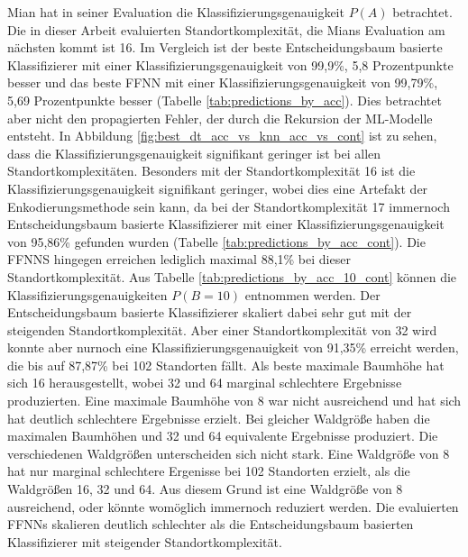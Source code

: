 \newline
\newline
Mian hat in seiner Evaluation die Klassifizierungsgenauigkeit $P(A)$ betrachtet.
Die in dieser Arbeit evaluierten Standortkomplexität, die Mians Evaluation am nächsten kommt ist 16.
Im Vergleich ist der beste Entscheidungsbaum basierte Klassifizierer mit einer Klassifizierungsgenauigkeit von 99,9\%, 5,8 Prozentpunkte besser
und das beste FFNN mit einer Klassifizierungsgenauigkeit von 99,79\%, 5,69 Prozentpunkte besser (Tabelle \ref{tab:predictions_by_acc}).
\newline
\newline
Dies betrachtet aber nicht den propagierten Fehler, der durch die Rekursion der ML-Modelle entsteht.
In Abbildung \ref{fig:best_dt_acc_vs_knn_acc_vs_cont} ist zu sehen, dass die Klassifizierungsgenauigkeit signifikant geringer ist bei allen Standortkomplexitäten.
Besonders mit der Standortkomplexität 16 ist die Klassifizierungsgenauigkeit signifikant geringer, wobei dies eine Artefakt der Enkodierungsmethode sein kann,
da bei der Standortkomplexität 17 immernoch Entscheidungsbaum basierte Klassifizierer mit einer Klassifizierungsgenauigkeit von 95,86\% gefunden wurden (Tabelle \ref{tab:predictions_by_acc_cont}).
Die FFNNS hingegen erreichen lediglich maximal 88,1\% bei dieser Standortkomplexität.
\newline
\newline
Aus Tabelle \ref{tab:predictions_by_acc_10_cont} können die Klassifizierungsgenauigkeiten $P(B=10)$ entnommen werden.
Der Entscheidungsbaum basierte Klassifizierer skaliert dabei sehr gut mit der steigenden Standortkomplexität.
Aber einer Standortkomplexität von 32 wird konnte aber nurnoch eine Klassifizierungsgenauigkeit von 91,35\% erreicht werden, die bis auf 87,87\% bei 102 Standorten fällt.
Als beste maximale Baumhöhe hat sich 16 herausgestellt, wobei 32 und 64 marginal schlechtere Ergebnisse produzierten.
Eine maximale Baumhöhe von 8 war nicht ausreichend und hat sich hat deutlich schlechtere Ergebnisse erzielt.
Bei gleicher Waldgröße haben die maximalen Baumhöhen und 32 und 64 equivalente Ergebnisse produziert.
Die verschiedenen Waldgrößen unterscheiden sich nicht stark.
Eine Waldgröße von 8 hat nur marginal schlechtere Ergenisse bei 102 Standorten erzielt, als die Waldgrößen 16, 32 und 64.
Aus diesem Grund ist eine Waldgröße von 8 ausreichend, oder könnte womöglich immernoch reduziert werden.
\newline
\newline
Die evaluierten FFNNs skalieren deutlich schlechter als die Entscheidungsbaum basierten Klassifizierer mit steigender Standortkomplexität.
